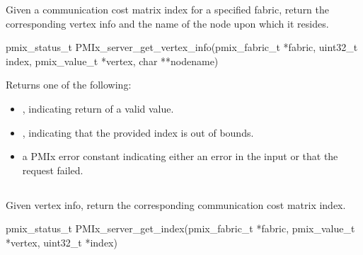 \summary

Given a communication cost matrix index for a specified fabric, return the corresponding vertex info and the name of the node upon which it resides.

\format

\cspecificstart
\begin{codepar}
pmix_status_t
PMIx_server_get_vertex_info(pmix_fabric_t *fabric,
                            uint32_t index, pmix_value_t *vertex,
                            char **nodename)
\end{codepar}
\cspecificend

\begin{arglist}
\end{arglist}

Returns one of the following:

\begin{itemize}
    \item {}, indicating return of a valid value.
    \item {}, indicating that the provided index is out of bounds.
    \item a \ac{PMIx} error constant indicating either an error in the input or that the request failed.
\end{itemize}

\descr


\subsection{}

\summary

Given vertex info, return the corresponding communication cost matrix index.

\format

\cspecificstart
\begin{codepar}
pmix_status_t
PMIx_server_get_index(pmix_fabric_t *fabric,
                      pmix_value_t *vertex,
                      uint32_t *index)
\end{codepar}
\cspecificend

